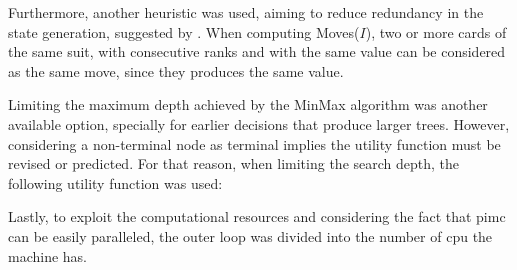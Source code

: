 Furthermore, another heuristic was used, aiming to reduce redundancy in the state generation, suggested by \cite{Buro}.
When computing Moves($I$), two or more cards of the same suit, with consecutive ranks and with the same value can be considered as the same move, since they produces the same value.

Limiting the maximum depth achieved by the MinMax algorithm was another available option, specially for earlier decisions that produce larger trees.
However, considering a non-terminal node as terminal implies the utility function must be revised or predicted.
For that reason, when limiting the search depth, the following utility function was used:

Lastly, to exploit the computational resources and considering the fact that \ac{pimc} can be easily paralleled, the outer loop was divided into the number of \ac{cpu} the machine has.













